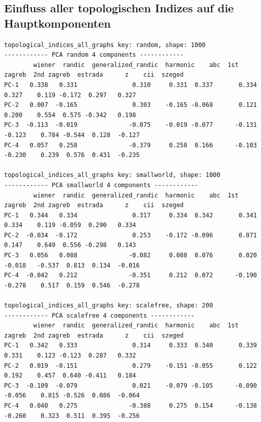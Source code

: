 \begin{landscape}
    \subsection{Einfluss aller topologischen Indizes auf die Hauptkomponenten} \label{sec:ti-pca}
    \begin{code}
        \begin{verbatim}   
topological_indices_all_graphs key: random, shape: 1000
------------ PCA random 4 components ------------
        wiener  randic  generalized_randic  harmonic    abc  1st zagreb  2nd zagreb  estrada      z    cii  szeged
PC-1   0.338   0.331               0.310     0.331  0.337       0.334       0.327    0.119 -0.172  0.297   0.327
PC-2   0.007  -0.165               0.303    -0.165 -0.068       0.121       0.200    0.554  0.575 -0.342   0.198
PC-3  -0.113  -0.019              -0.075    -0.019 -0.077      -0.131      -0.123    0.784 -0.544  0.128  -0.127
PC-4   0.057   0.258              -0.379     0.258  0.166      -0.103      -0.230    0.239  0.576  0.431  -0.235

topological_indices_all_graphs key: smallworld, shape: 1000
------------ PCA smallworld 4 components ------------
        wiener  randic  generalized_randic  harmonic    abc  1st zagreb  2nd zagreb  estrada      z    cii  szeged
PC-1   0.344   0.334               0.317     0.334  0.342       0.341       0.334    0.119 -0.059  0.290   0.334
PC-2  -0.034  -0.172               0.253    -0.172 -0.096       0.071       0.147    0.649  0.556 -0.298   0.143
PC-3   0.056   0.088              -0.082     0.088  0.076       0.020      -0.018   -0.537  0.813  0.134  -0.016
PC-4  -0.042   0.212              -0.351     0.212  0.072      -0.190      -0.278    0.517  0.159  0.546  -0.278

topological_indices_all_graphs key: scalefree, shape: 200
------------ PCA scalefree 4 components ------------
        wiener  randic  generalized_randic  harmonic    abc  1st zagreb  2nd zagreb  estrada      z    cii  szeged
PC-1   0.342   0.333               0.314     0.333  0.340       0.339       0.331    0.123 -0.123  0.287   0.332
PC-2   0.019  -0.151               0.279    -0.151 -0.055       0.122       0.192    0.457  0.640 -0.411   0.184
PC-3  -0.109  -0.079               0.021    -0.079 -0.105      -0.090      -0.056    0.815 -0.526  0.086  -0.064
PC-4   0.040   0.275              -0.388     0.275  0.154      -0.138      -0.260    0.323  0.511  0.395  -0.256


\end{verbatim}
\end{code}
\end{landscape}
